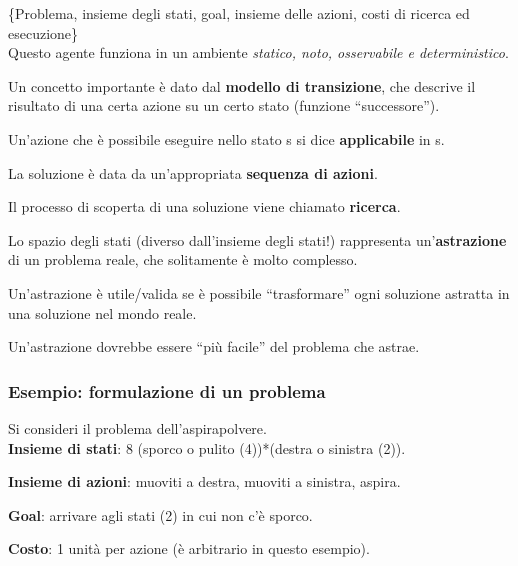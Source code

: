 \{Problema, insieme degli stati, goal, insieme delle azioni, costi
di ricerca ed esecuzione\}\\

Questo agente funziona in un ambiente \textit{statico, noto, osservabile e
deterministico}.

Un concetto importante è dato dal \textbf{modello di transizione}, che
descrive il risultato di una certa azione su un certo stato
(funzione ``successore'').

Un'azione che è possibile eseguire nello stato s si dice \textbf{applicabile}
in s.

La soluzione è data da un'appropriata \textbf{sequenza di azioni}.

Il processo di scoperta di una soluzione viene chiamato \textbf{ricerca}.

Lo spazio degli stati (diverso dall'insieme degli stati!) rappresenta
un'\textbf{astrazione} di un problema reale, che solitamente è molto complesso.

Un'astrazione è utile/valida se è possibile ``trasformare'' ogni soluzione
astratta in una soluzione nel mondo reale.

Un'astrazione dovrebbe essere ``più facile'' del problema che astrae.

\subsubsection{Esempio: formulazione di un problema}

Si consideri il problema dell'aspirapolvere. \\

\textbf{Insieme di stati}: 8 (sporco o pulito (4))*(destra o sinistra (2)).

\textbf{Insieme di azioni}: muoviti a destra, muoviti a sinistra, aspira.

\textbf{Goal}: arrivare agli stati (2) in cui non c'è sporco.

\textbf{Costo}: 1 unità per azione (è arbitrario in questo esempio).
